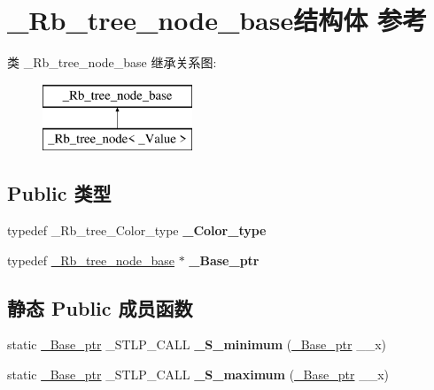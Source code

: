 \hypertarget{struct___rb__tree__node__base}{}\section{\+\_\+\+Rb\+\_\+tree\+\_\+node\+\_\+base结构体 参考}
\label{struct___rb__tree__node__base}
类 \+\_\+\+Rb\+\_\+tree\+\_\+node\+\_\+base 继承关系图\+:\begin{figure}[H]
\begin{center}
\leavevmode
\includegraphics[height=2.000000cm]{struct___rb__tree__node__base}
\end{center}
\end{figure}
\subsection*{Public 类型}
\begin{DoxyCompactItemize}
\item 
\mbox{\label{struct___rb__tree__node__base_a2507eb48b2751c73bbc48e14f9bd2f67}} 
typedef \+\_\+\+Rb\+\_\+tree\+\_\+\+Color\+\_\+type {\bfseries \+\_\+\+Color\+\_\+type}
\item 
\mbox{\label{struct___rb__tree__node__base_a43f8109abd3007325f11ea782bba475e}} 
typedef \hyperlink{struct___rb__tree__node__base}{\+\_\+\+Rb\+\_\+tree\+\_\+node\+\_\+base} $\ast$ {\bfseries \+\_\+\+Base\+\_\+ptr}
\end{DoxyCompactItemize}
\subsection*{静态 Public 成员函数}
\begin{DoxyCompactItemize}
\item 
\mbox{\label{struct___rb__tree__node__base_afe09820008f14d4d8b900d9ea59e96ce}} 
static \hyperlink{struct___rb__tree__node__base}{\+\_\+\+Base\+\_\+ptr} \+\_\+\+S\+T\+L\+P\+\_\+\+C\+A\+LL {\bfseries \+\_\+\+S\+\_\+minimum} (\hyperlink{struct___rb__tree__node__base}{\+\_\+\+Base\+\_\+ptr} \+\_\+\+\_\+x)
\item 
\mbox{\label{struct___rb__tree__node__base_a65e6c05f2e691854fcc568d2abdfa4d7}} 
static \hyperlink{struct___rb__tree__node__base}{\+\_\+\+Base\+\_\+ptr} \+\_\+\+S\+T\+L\+P\+\_\+\+C\+A\+LL {\bfseries \+\_\+\+S\+\_\+maximum} (\hyperlink{struct___rb__tree__node__base}{\+\_\+\+Base\+\_\+ptr} \+\_\+\+\_\+x)
\end{DoxyCompactItemize}

